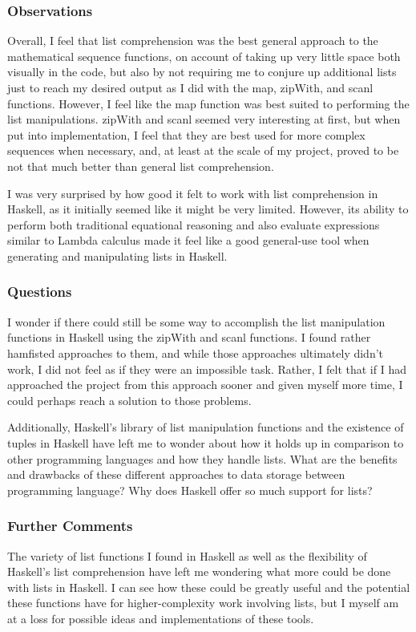 \documentclass{article}
\theoremstyle{theorem}
\theoremstyle{definition}
\theoremstyle{remark}
\begin{document}
\subsubsection{Observations}
Overall, I feel that list comprehension was the best general approach to the mathematical sequence functions, on account of taking up very little space both visually in the code, but also by not requiring me to conjure up additional lists just to reach my desired output as I did with the map, zipWith, and scanl functions. However, I feel like the map function was best suited to performing the list manipulations. zipWith and scanl seemed very interesting at first, but when put into implementation, I feel that they are best used for more complex sequences when necessary, and, at least at the scale of my project, proved to be not that much better than general list comprehension.

\medskip\noindent
I was very surprised by how good it felt to work with list comprehension in Haskell, as it initially seemed like it might be very limited. However, its ability to perform both traditional equational reasoning and also evaluate expressions similar to Lambda calculus made it feel like a good general-use tool when generating and manipulating lists in Haskell. 

\subsubsection{Questions}
I wonder if there could still be some way to accomplish the list manipulation functions in Haskell using the zipWith and scanl functions. I found rather hamfisted approaches to them, and while those approaches ultimately didn't work, I did not feel as if they were an impossible task. Rather, I felt that if I had approached the project from this approach sooner and given myself more time, I could perhaps reach a solution to those problems.

\medskip\noindent
Additionally, Haskell's library of list manipulation functions and the existence of tuples in Haskell have left me to wonder about how it holds up in comparison to other programming languages and how they handle lists. What are the benefits and drawbacks of these different approaches to data storage between programming language? Why does Haskell offer so much support for lists?

\subsubsection{Further Comments}
The variety of list functions I found in Haskell as well as the flexibility of Haskell's list comprehension have left me wondering what more could be done with lists in Haskell. I can see how these could be greatly useful and the potential these functions have for higher-complexity work involving lists, but I myself am at a loss for possible ideas and implementations of these tools.
\end{document}
